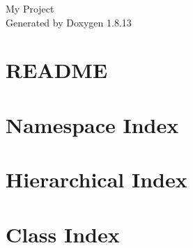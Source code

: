 \documentclass[twoside]{book}
\newcommand{\+}{\discretionary{\mbox{\scriptsize$\hookleftarrow$}}{}{}}
\newcommand{\clearemptydoublepage}{%
  \newpage{\pagestyle{empty}\cleardoublepage}%
}
\begin{document}
\hypersetup{pageanchor=false,
             bookmarksnumbered=true,
             pdfencoding=unicode
            }
\begin{titlepage}
\vspace*{7cm}
\begin{center}%
{\Large My Project }\\
\vspace*{1cm}
{\large Generated by Doxygen 1.8.13}\\
\end{center}
\end{titlepage}
\clearemptydoublepage
{}
\tableofcontents
\clearemptydoublepage
{}
\hypersetup{pageanchor=true}

\chapter{R\+E\+A\+D\+ME}
\label{md__r_e_a_d_m_e}

\chapter{Namespace Index}

\chapter{Hierarchical Index}

\chapter{Class Index}

\end{document}
